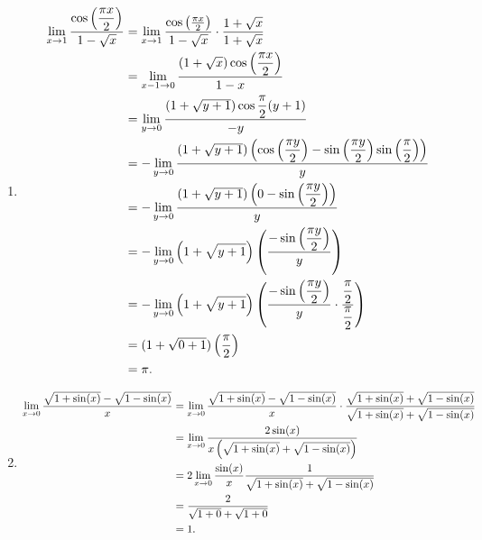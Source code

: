 \begin{example}
\begin{enumerate}
		\item \begin{align*}
		\lim\limits_{x\to 1}\dfrac{\cos\left(\dfrac{\pi x}{2}\right)}{1-\sqrt{x}}&=\lim\limits_{x\to 1}\dfrac{\cos\left(\frac{\pi x}{2}\right)}{1-\sqrt{x}}\cdot\dfrac{1+\sqrt{x}}{1+\sqrt{x}}\\
		&=\lim\limits_{x-1\to 0}\dfrac{\left(1+\sqrt{x}\right)\cos\left(\dfrac{\pi x}{2}\right)}{1-x}\\
		&=\lim\limits_{y\to 0}\dfrac{\left(1+\sqrt{y+1}\right)\cos{\dfrac{\pi}{2}(y+1)}}{-y}\\
		&=-\lim\limits_{y\to 0}\dfrac{\left(1+\sqrt{y+1}\right)\left(\cos\left(\dfrac{\pi y}{2}\right)-\sin\left(\dfrac{\pi y}{2}\right)\sin\left(\dfrac{\pi}{2}\right)\right)}{y}\\
		&=-\lim\limits_{y\to 0}\dfrac{\left(1+\sqrt{y+1}\right)\left(0-\sin\left(\dfrac{\pi y}{2}\right)\right)}{y}\\
		&=-\lim\limits_{y\to 0}{\left(1+\sqrt{y+1}\right)\left(\dfrac{-\sin\left(\dfrac{\pi y}{2}\right)}{y}\right)}\\
		&=-\lim\limits_{y\to 0}{\left(1+\sqrt{y+1}\right)\left(\dfrac{-\sin\left(\dfrac{\pi y}{2}\right)}{y}\cdot\dfrac{\dfrac{\pi}{2}}{\dfrac{\pi}{2}}\right)}\\
		&=(1+\sqrt{0+1})\left(\dfrac{\pi}{2}\right)\\
		&=\pi.
		\end{align*}
		
		\item \begin{align*}
		\lim\limits_{x\to 0}\dfrac{\sqrt{1+\sin(x)}-\sqrt{1-\sin(x)}}{x}&=\lim\limits_{x\to 0}\dfrac{\sqrt{1+\sin(x)}-\sqrt{1-\sin(x)}}{x}\cdot\dfrac{\sqrt{1+\sin(x)}+\sqrt{1-\sin(x)}}{\sqrt{1+\sin(x)}+\sqrt{1-\sin(x)}}\\
		&=\lim\limits_{x\to 0}\dfrac{2\sin(x)}{x\left(\sqrt{1+\sin(x)}+\sqrt{1-\sin(x)}\right)}\\
		&=2\lim\limits_{x\to 0}\dfrac{\sin(x)}{x}\dfrac{1}{\sqrt{1+\sin(x)}+\sqrt{1-\sin(x)}}\\
		&=\dfrac{2}{\sqrt{1+0}+\sqrt{1+0}}\\
		&=1.
		\end{align*}
	\end{enumerate}
\end{example}

